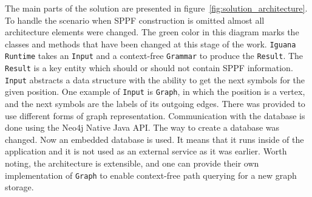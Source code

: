 The main parts of the solution are presented in figure~\ref{fig:solution_architecture}. To handle the scenario when SPPF construction is omitted almost all architecture elements were changed. The green color in this diagram marks the classes and methods that have been changed at this stage of the work. \texttt{Iguana Runtime} takes an \texttt{Input} and a context-free \texttt{Grammar} to produce the \texttt{Result}. The  \texttt{Result} is a key entity which should or should not contain SPPF information. \texttt{Input} abstracts a data structure with the ability to get the next symbols for the given position. One example of \texttt{Input} is \texttt{Graph}, in which the position is a vertex, and the next symbols are the labels of its outgoing edges. There was provided to use different forms of graph representation. Communication with the database is done using the Neo4j Native Java API. The way to create a database was changed. Now an embedded database is used. It means that it runs inside of the application and it is not used as an external service as it was earlier. Worth noting, the architecture is extensible, and one can provide their own implementation of \texttt{Graph} to enable context-free path querying for a new graph storage.